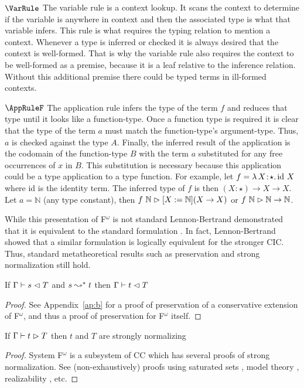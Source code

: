 $\VarRule$ The variable rule is a context lookup.
It scans the context to determine if the variable is anywhere in context and then the associated type is what that variable infers.
This rule is what requires the typing relation to mention a context.
Whenever a type is inferred or checked it is always desired that the context is well-formed.
That is why the variable rule also requires the context to be well-formed as a premise, because it is a leaf relative to the inference relation.
Without this additional premise there could be typed terms in ill-formed contexts.

$\AppRuleF$ The application rule infers the type of the term $f$ and reduces that type until it looks like a function-type.
Once a function type is required it is clear that the type of the term $a$ must match the function-type's argument-type.
Thus, $a$ is checked against the type $A$.
Finally, the inferred result of the application is the codomain of the function-type $B$ with the term $a$ substituted for any free occurrences of $x$ in $B$.
This substitution is necessary because this application could be a type application to a type function.
For example, let $f = {\lambda}\, X\! : \! \star.\, \text{id}\ X$ where id is the identity term.
The inferred type of $f$ is then $(X : \star) \to X \to X$.
Let $a = \mathbb{N}$ (any type constant), then $f\ \mathbb{N} \vartriangleright [X := \mathbb{N}](X \to X)$ or $f\ \mathbb{N} \infr \mathbb{N} \to \mathbb{N}$.

While this presentation of F$^\omega$ is not standard Lennon-Bertrand demonstrated that it is equivalent to the standard formulation \cite{lennon2021}.
In fact, Lennon-Bertrand showed that a similar formulation is logically equivalent for the stronger CIC.
Thus, standard metatheoretical results such as preservation and strong normalization still hold.

\begin{lemma}
    If $\Gamma \vdash s \vartriangleleft T$ and $s \leadsto^* t$ then $\Gamma \vdash t \vartriangleleft T$
\end{lemma}
\begin{proof}
    See Appendix~\ref{ap:b} for a proof of preservation of a conservative extension of F$^\omega$, and thus a proof of preservation for F$^\omega$ itself.
\end{proof}

\begin{theorem}
    If $\Gamma \vdash t \vartriangleright T$ then $t$ and $T$ are strongly normalizing
\end{theorem}
\begin{proof}
    System F$^\omega$ is a subsystem of CC which has several proofs of strong normalization.
    See (non-exhaustively) proofs using saturated sets \cite{geuvers1994_sn_satset}, model theory \cite{terlouw1995_sn}, realizability \cite{ong1993}, etc.
\end{proof}


